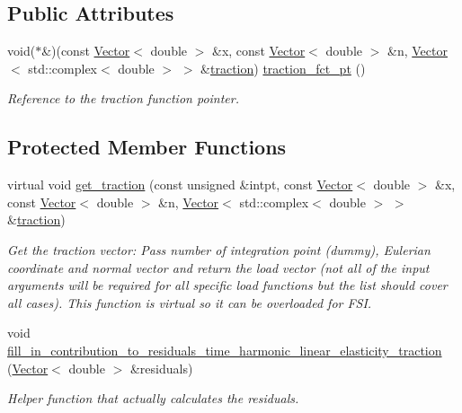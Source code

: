 \subsection*{Public Attributes}
\begin{DoxyCompactItemize}
\item 
void($\ast$\&)(const \hyperlink{classoomph_1_1Vector}{Vector}$<$ double $>$ \&x, const \hyperlink{classoomph_1_1Vector}{Vector}$<$ double $>$ \&n, \hyperlink{classoomph_1_1Vector}{Vector}$<$ std\+::complex$<$ double $>$ $>$ \&\hyperlink{classoomph_1_1PMLTimeHarmonicLinearElasticityTractionElement_ae83042121b4033f28c95ca8899b02ee8}{traction}) \hyperlink{classoomph_1_1PMLTimeHarmonicLinearElasticityTractionElement_a093b638938640df651c4545ee236c1c3}{traction\+\_\+fct\+\_\+pt} ()
\begin{DoxyCompactList}\small\item\em Reference to the traction function pointer. \end{DoxyCompactList}\end{DoxyCompactItemize}
\subsection*{Protected Member Functions}
\begin{DoxyCompactItemize}
\item 
virtual void \hyperlink{classoomph_1_1PMLTimeHarmonicLinearElasticityTractionElement_ac75ee57c1976bc09d5797584c34d2c06}{get\+\_\+traction} (const unsigned \&intpt, const \hyperlink{classoomph_1_1Vector}{Vector}$<$ double $>$ \&x, const \hyperlink{classoomph_1_1Vector}{Vector}$<$ double $>$ \&n, \hyperlink{classoomph_1_1Vector}{Vector}$<$ std\+::complex$<$ double $>$ $>$ \&\hyperlink{classoomph_1_1PMLTimeHarmonicLinearElasticityTractionElement_ae83042121b4033f28c95ca8899b02ee8}{traction})
\begin{DoxyCompactList}\small\item\em Get the traction vector\+: Pass number of integration point (dummy), Eulerian coordinate and normal vector and return the load vector (not all of the input arguments will be required for all specific load functions but the list should cover all cases). This function is virtual so it can be overloaded for F\+SI. \end{DoxyCompactList}\item 
void \hyperlink{classoomph_1_1PMLTimeHarmonicLinearElasticityTractionElement_a4ac424a9a0f3c1dd67cf22669b3c63cb}{fill\+\_\+in\+\_\+contribution\+\_\+to\+\_\+residuals\+\_\+time\+\_\+harmonic\+\_\+linear\+\_\+elasticity\+\_\+traction} (\hyperlink{classoomph_1_1Vector}{Vector}$<$ double $>$ \&residuals)
\begin{DoxyCompactList}\small\item\em Helper function that actually calculates the residuals. \end{DoxyCompactList}\end{DoxyCompactItemize}
